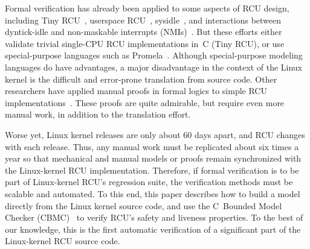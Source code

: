 Formal verification has already been applied to some aspects of RCU design, 
including Tiny RCU~\cite{VerificationChallenges}, userspace RCU~\cite{DesnoyersOSR13}, 
sysidle~\cite{VerificationChallenges}, and interactions between
dyntick-idle and non-maskable interrupts (NMIs)~\cite{ValDyntickNMI}.
%
But these efforts either validate trivial single-CPU RCU implementations
in~C (Tiny RCU), or use special-purpose languages such as
Promela~\cite{HolzmannTSE97SPIN}.  Although special-purpose modeling
languages do have advantages, a major disadvantage in the context of the
Linux kernel is the difficult and error-prone translation from source code.
%
Other researchers have applied manual proofs in formal logics to simple 
RCU implementations~\cite{YangESOP13RCU,DreyerPLDI15RCU}. These proofs are %
quite admirable, but require even more manual work, in addition
to the translation effort.

Worse yet, Linux kernel releases are only about 60 days apart, and RCU
changes with each release.  Thus, any manual work must be replicated about
six times a year so that mechanical and manual models or proofs remain
synchronized with the Linux-kernel RCU implementation.
%
Therefore, if formal verification is to be part of Linux-kernel RCU's 
regression suite, the verification methods must be scalable and automated. 
%
To this end, this paper describes how to build a model directly from the
Linux kernel source code, and use the C~Bounded Model Checker
(CBMC)~\cite{KroeningTACAS04CBMC} to verify RCU's safety and liveness
properties.
%
To the best of our knowledge, this is the first automatic
verification of a significant part of the Linux-kernel RCU source code.
